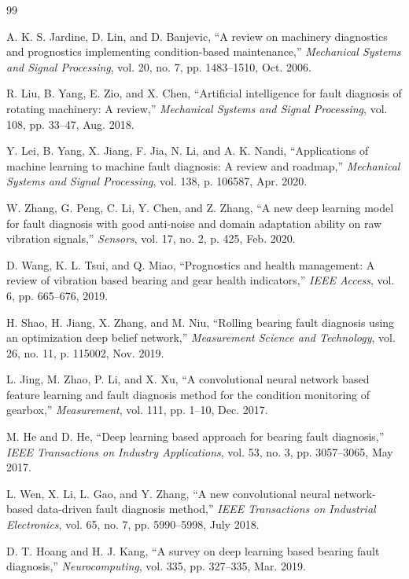 \documentclass[11pt,a4paper]{article}
\begin{document}
\begin{thebibliography}{99}

A. K. S. Jardine, D. Lin, and D. Banjevic, ``A review on machinery diagnostics and prognostics implementing condition-based maintenance,'' \textit{Mechanical Systems and Signal Processing}, vol. 20, no. 7, pp. 1483--1510, Oct. 2006.

R. Liu, B. Yang, E. Zio, and X. Chen, ``Artificial intelligence for fault diagnosis of rotating machinery: A review,'' \textit{Mechanical Systems and Signal Processing}, vol. 108, pp. 33--47, Aug. 2018.

Y. Lei, B. Yang, X. Jiang, F. Jia, N. Li, and A. K. Nandi, ``Applications of machine learning to machine fault diagnosis: A review and roadmap,'' \textit{Mechanical Systems and Signal Processing}, vol. 138, p. 106587, Apr. 2020.

W. Zhang, G. Peng, C. Li, Y. Chen, and Z. Zhang, ``A new deep learning model for fault diagnosis with good anti-noise and domain adaptation ability on raw vibration signals,'' \textit{Sensors}, vol. 17, no. 2, p. 425, Feb. 2020.

D. Wang, K. L. Tsui, and Q. Miao, ``Prognostics and health management: A review of vibration based bearing and gear health indicators,'' \textit{IEEE Access}, vol. 6, pp. 665--676, 2019.

H. Shao, H. Jiang, X. Zhang, and M. Niu, ``Rolling bearing fault diagnosis using an optimization deep belief network,'' \textit{Measurement Science and Technology}, vol. 26, no. 11, p. 115002, Nov. 2019.

L. Jing, M. Zhao, P. Li, and X. Xu, ``A convolutional neural network based feature learning and fault diagnosis method for the condition monitoring of gearbox,'' \textit{Measurement}, vol. 111, pp. 1--10, Dec. 2017.

M. He and D. He, ``Deep learning based approach for bearing fault diagnosis,'' \textit{IEEE Transactions on Industry Applications}, vol. 53, no. 3, pp. 3057--3065, May 2017.

L. Wen, X. Li, L. Gao, and Y. Zhang, ``A new convolutional neural network-based data-driven fault diagnosis method,'' \textit{IEEE Transactions on Industrial Electronics}, vol. 65, no. 7, pp. 5990--5998, July 2018.

D. T. Hoang and H. J. Kang, ``A survey on deep learning based bearing fault diagnosis,'' \textit{Neurocomputing}, vol. 335, pp. 327--335, Mar. 2019.


\end{thebibliography}
\end{document}

